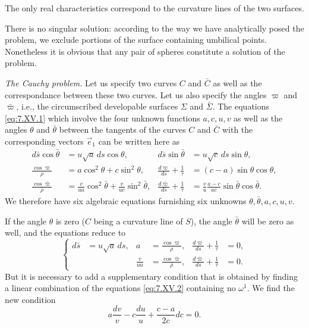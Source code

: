 \documentclass[leqno,11pt]{book}
\numberwithin{equation}{chapter}
\theoremstyle{shape1}
\theoremstyle{shape0}
\theoremstyle{shape2}
\theoremstyle{definition}
\begin{document}
The only real characteristics correspond to the curvature lines of the two surfaces.

There is no singular solution: according to the way we have analytically posed the problem, we exclude portions of the surface containing umbilical points. Nonetheless it is obvious that any pair of spheres constitute a solution of the problem.

\vspace{12pt}\fsec \emph{The Cauchy problem.} Let us specify two curves $C$ and $\bar C$ as well as the correspondance between these two curves. Let us also specify the angles $\varpi$ and $\bar \varpi$, i.e., the circumscribed developable surfaces $\Sigma$ and $\bar\Sigma$. The equations \eqref{eq:7.XV.1} which involve the four unknown functions $a,c,u,v$ as well as the angles $\theta$ and $\bar\theta$ between the tangents of the curves $C$ and $\bar C$ with the corresponding vectors $\vec e_{1}$ can be written here as
\begin{align*}
  d\bar s\cos\bar\theta&=u\sqrt{a}\,ds\cos\theta,&d\bar s\sin\bar\theta&=u\sqrt{c}\,ds\sin\theta,\\
  \frac{\cos\varpi}{\rho}&=a\cos^{2}\theta+c\sin^{2}\theta,&\frac{d\varpi}{ds}+\frac{1}{\tau}&=(c-a)\sin\theta\cos\theta,\\
  \frac{\cos\bar\varpi}{\bar\rho}&=\frac{v}{ua}\cos^{2}\bar\theta+\frac{v}{uc}\sin^{2}\bar\theta,&\frac{d\bar\varpi}{d\bar s}+\frac{1}{\bar\tau}&=\frac{v}{u}\frac{a-c}{ac}\sin\bar\theta\cos\bar\theta.
\end{align*}
We therefore have six algebraic equations furnishing six unknowns $\theta,\bar\theta,a,c,u,v$.

If the angle $\theta$ is zero ($C$ being a curvature line of $S$), the angle $\bar\theta$ will be zero as well, and the equations reduce to
\begin{equation}
  \label{eq:7.XV.3}\tag{XV, 3}
  \left\{
    \begin{aligned}
      d\bar s&=u\sqrt{a}\,ds,&a&=\frac{\cos\varpi}{\rho},&\frac{d\varpi}{ds}+\frac{1}{\tau}&=0,\\
      &&\frac{v}{ua}&=\frac{\cos\bar\varpi}{\bar\rho},&\frac{d\bar\varpi}{d\bar s}+\frac{1}{\bar\tau}&=0.
    \end{aligned}
  \right.
\end{equation}
But it is necessary to add a supplementary condition that is obtained by finding a linear combination of the equations \eqref{eq:7.XV.2} containing no $\omega^{1}$. We find the new condition
\begin{equation}
  \label{eq:7.XV.4}\tag{XV, 4}
  a\frac{dv}{v}-c\frac{du}{u}+\frac{c-a}{2c}dc=0.
\end{equation}
\end{document}
